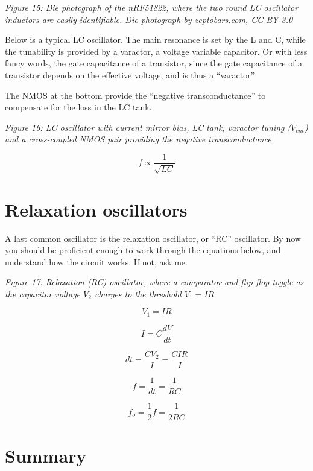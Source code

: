 {
\centering
{}
}

\emph{Figure 15: Die photograph of the nRF51822, where the two round LC
oscillator inductors are easily identifiable. Die photograph by
\href{https://zeptobars.com/en/read/nRF51822-Bluetooth-LE-SoC-Cortex-M0}{zeptobars.com},
\href{https://creativecommons.org/licenses/by/3.0/}{CC BY 3.0}}

Below is a typical LC oscillator. The main resonance is set by the L and
C, while the tunability is provided by a varactor, a voltage variable
capacitor. Or with less fancy words, the gate capacitance of a
transistor, since the gate capacitance of a transistor depends on the
effective voltage, and is thus a ``varactor''

The NMOS at the bottom provide the ``negative transconductance'' to
compensate for the loss in the LC tank.


{
\centering
{}
}

\emph{Figure 16: LC oscillator with current mirror bias, LC tank,
varactor tuning (\(V_{cnt}\)) and a cross-coupled NMOS pair providing
the negative transconductance}

\[ f \propto \frac{1}{\sqrt{LC}}\]

\section{Relaxation oscillators}\label{relaxation-oscillators}

A last common oscillator is the relaxation oscillator, or ``RC''
oscillator. By now you should be proficient enough to work through the
equations below, and understand how the circuit works. If not, ask me.


{
\centering
{}
}

\emph{Figure 17: Relaxation (RC) oscillator, where a comparator and
flip-flop toggle as the capacitor voltage \(V_2\) charges to the
threshold \(V_1 = IR\)}

\[ V_1 = I R \]

\[ I = C \frac{dV}{dt}\]

\[ dt = \frac{C V_2}{I} = \frac{C I R}{I}\]

\[ f = \frac{1}{dt} = \frac{1}{RC}\]

\[ f_o = \frac{1}{2}f =  \frac{1}{2RC}\]

\section{Summary}\label{summary}

